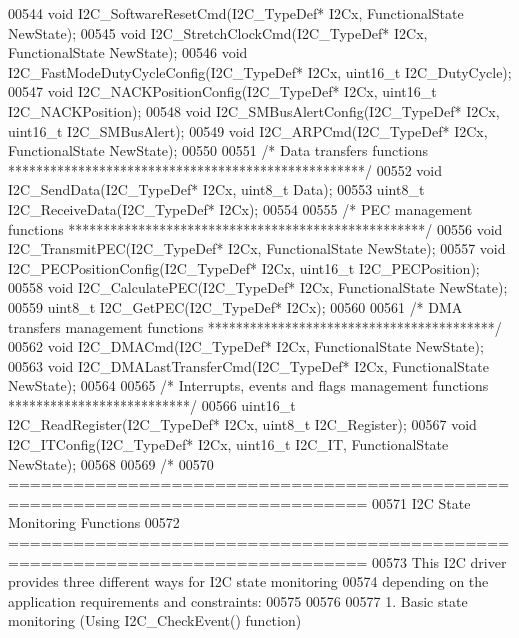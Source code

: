 \begin{DoxyCode}
00544 \textcolor{keywordtype}{void} I2C_SoftwareResetCmd(I2C\_TypeDef* I2Cx, FunctionalState NewState);
00545 \textcolor{keywordtype}{void} I2C_StretchClockCmd(I2C\_TypeDef* I2Cx, FunctionalState NewState);
00546 \textcolor{keywordtype}{void} I2C_FastModeDutyCycleConfig(I2C\_TypeDef* I2Cx, uint16\_t I2C\_DutyCycle);
00547 \textcolor{keywordtype}{void} I2C_NACKPositionConfig(I2C\_TypeDef* I2Cx, uint16\_t I2C\_NACKPosition);
00548 \textcolor{keywordtype}{void} I2C_SMBusAlertConfig(I2C\_TypeDef* I2Cx, uint16\_t I2C\_SMBusAlert);
00549 \textcolor{keywordtype}{void} I2C_ARPCmd(I2C\_TypeDef* I2Cx, FunctionalState NewState);
00550 
00551 \textcolor{comment}{/* Data transfers functions ***************************************************/}
00552 \textcolor{keywordtype}{void} I2C_SendData(I2C\_TypeDef* I2Cx, uint8\_t Data);
00553 uint8\_t I2C_ReceiveData(I2C\_TypeDef* I2Cx);
00554 
00555 \textcolor{comment}{/* PEC management functions ***************************************************/}
00556 \textcolor{keywordtype}{void} I2C_TransmitPEC(I2C\_TypeDef* I2Cx, FunctionalState NewState);
00557 \textcolor{keywordtype}{void} I2C_PECPositionConfig(I2C\_TypeDef* I2Cx, uint16\_t I2C\_PECPosition);
00558 \textcolor{keywordtype}{void} I2C_CalculatePEC(I2C\_TypeDef* I2Cx, FunctionalState NewState);
00559 uint8\_t I2C_GetPEC(I2C\_TypeDef* I2Cx);
00560 
00561 \textcolor{comment}{/* DMA transfers management functions *****************************************/}
00562 \textcolor{keywordtype}{void} I2C_DMACmd(I2C\_TypeDef* I2Cx, FunctionalState NewState);
00563 \textcolor{keywordtype}{void} I2C_DMALastTransferCmd(I2C\_TypeDef* I2Cx, FunctionalState NewState);
00564 
00565 \textcolor{comment}{/* Interrupts, events and flags management functions **************************/}
00566 uint16\_t I2C_ReadRegister(I2C\_TypeDef* I2Cx, uint8\_t I2C\_Register);
00567 \textcolor{keywordtype}{void} I2C_ITConfig(I2C\_TypeDef* I2Cx, uint16\_t I2C\_IT, FunctionalState NewState);
00568 
00569 \textcolor{comment}{/* }
00570 \textcolor{comment}{ ===============================================================================}
00571 \textcolor{comment}{                          I2C State Monitoring Functions}
00572 \textcolor{comment}{ ===============================================================================}
00573 \textcolor{comment}{  This I2C driver provides three different ways for I2C state monitoring}
00574 \textcolor{comment}{  depending on the application requirements and constraints:}
00575 \textcolor{comment}{         }
00576 \textcolor{comment}{   }
00577 \textcolor{comment}{     1. Basic state monitoring (Using I2C\_CheckEvent() function)}

\end{DoxyCode}
